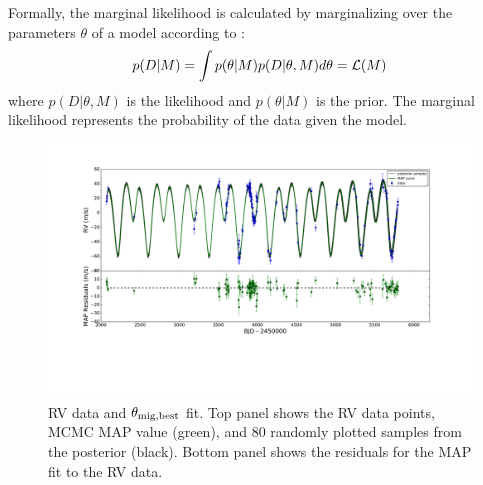 Formally, the marginal likelihood is calculated by marginalizing over the parameters $\theta$ of a model according to \citep{Gregory2005}:
\begin{equation}
p(D|M) = \int p(\theta|M)p(D|\theta,M)d\theta = \mathcal{L}(M)
\label{eq:GL}
\end{equation}
where $p(D|\theta, M)$ is the likelihood and $p(\theta|M)$ is the prior. 
The marginal likelihood represents the probability of the data given the model. 

\begin{figure}
\includegraphics[trim=4.4cm 7cm 4.5cm 0cm, width=\textwidth]{chap6/images/taueinner_migrate3e+03_Kin7e+00_Kout3e+02_sd931.pdf}
\caption{RV data and $\theta_{\rm mig,best}$ fit.
Top panel shows the RV data points, MCMC MAP value (green), and 80 randomly plotted samples from the posterior (black). 
Bottom panel shows the residuals for the MAP fit to the RV data. 
 }
\label{fig:bestform}
\end{figure}

